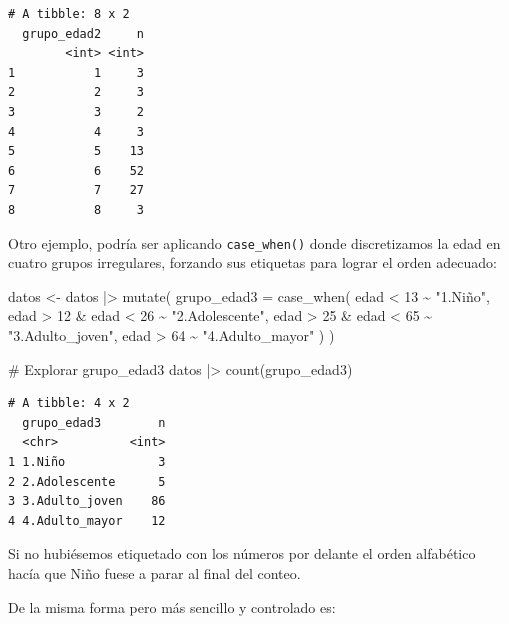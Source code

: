 \documentclass[
  spanish,
  a4paper,
]{scrbook}
\newenvironment{Shaded}{\begin{snugshade}}{\end{snugshade}}
\newcommand{\AttributeTok}[1]{\textcolor[rgb]{0.40,0.45,0.13}{#1}}
\newcommand{\CommentTok}[1]{\textcolor[rgb]{0.37,0.37,0.37}{#1}}
\newcommand{\DecValTok}[1]{\textcolor[rgb]{0.68,0.00,0.00}{#1}}
\newcommand{\FunctionTok}[1]{\textcolor[rgb]{0.28,0.35,0.67}{#1}}
\newcommand{\NormalTok}[1]{\textcolor[rgb]{0.00,0.23,0.31}{#1}}
\newcommand{\OtherTok}[1]{\textcolor[rgb]{0.00,0.23,0.31}{#1}}
\newcommand{\SpecialCharTok}[1]{\textcolor[rgb]{0.37,0.37,0.37}{#1}}
\newcommand{\StringTok}[1]{\textcolor[rgb]{0.13,0.47,0.30}{#1}}
\begin{document}
\begin{verbatim}
# A tibble: 8 x 2
  grupo_edad2     n
        <int> <int>
1           1     3
2           2     3
3           3     2
4           4     3
5           5    13
6           6    52
7           7    27
8           8     3
\end{verbatim}

Otro ejemplo, podría ser aplicando \texttt{case\_when()} donde
discretizamos la edad en cuatro grupos irregulares, forzando sus
etiquetas para lograr el orden adecuado:

\begin{Shaded}
\begin{Highlighting}[]
\NormalTok{datos }\OtherTok{\textless{}{-}}\NormalTok{ datos }\SpecialCharTok{|\textgreater{}}
  \FunctionTok{mutate}\NormalTok{(}
    \AttributeTok{grupo\_edad3 =} \FunctionTok{case\_when}\NormalTok{(}
\NormalTok{      edad }\SpecialCharTok{\textless{}} \DecValTok{13} \SpecialCharTok{\textasciitilde{}} \StringTok{"1.Niño"}\NormalTok{,}
\NormalTok{      edad }\SpecialCharTok{\textgreater{}} \DecValTok{12} \SpecialCharTok{\&}\NormalTok{ edad }\SpecialCharTok{\textless{}} \DecValTok{26} \SpecialCharTok{\textasciitilde{}} \StringTok{"2.Adolescente"}\NormalTok{,}
\NormalTok{      edad }\SpecialCharTok{\textgreater{}} \DecValTok{25} \SpecialCharTok{\&}\NormalTok{ edad }\SpecialCharTok{\textless{}} \DecValTok{65} \SpecialCharTok{\textasciitilde{}} \StringTok{"3.Adulto\_joven"}\NormalTok{,}
\NormalTok{      edad }\SpecialCharTok{\textgreater{}} \DecValTok{64} \SpecialCharTok{\textasciitilde{}} \StringTok{"4.Adulto\_mayor"}
\NormalTok{    )}
\NormalTok{  )}

\CommentTok{\# Explorar grupo\_edad3}
\NormalTok{datos }\SpecialCharTok{|\textgreater{}}
  \FunctionTok{count}\NormalTok{(grupo\_edad3)}
\end{Highlighting}
\end{Shaded}

\begin{verbatim}
# A tibble: 4 x 2
  grupo_edad3        n
  <chr>          <int>
1 1.Niño             3
2 2.Adolescente      5
3 3.Adulto_joven    86
4 4.Adulto_mayor    12
\end{verbatim}

Si no hubiésemos etiquetado con los números por delante el orden
alfabético hacía que Niño fuese a parar al final del conteo.

De la misma forma pero más sencillo y controlado es:
\end{document}
